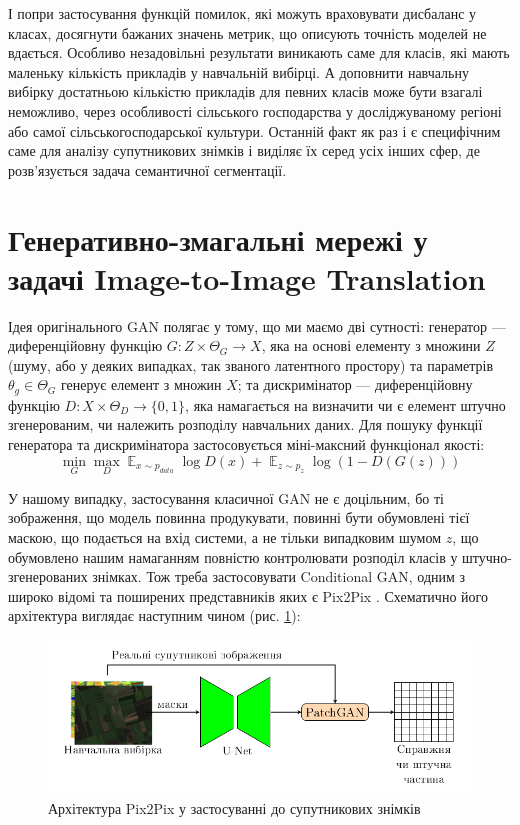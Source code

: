 \documentclass{ConfFTI}
\DeclareMathOperator{\E}{\mathbb{E}}
\begin{document}
І попри застосування
функцій помилок, які можуть враховувати дисбаланс у
класах, досягнути бажаних значень метрик, що описують точність
моделей не вдається.
Особливо незадовільні результати виникають саме для класів,
які мають маленьку кількість прикладів у навчальній вибірці.
А доповнити навчальну вибірку достатньою кількістю
прикладів для певних класів може бути взагалі неможливо,
через особливості сільського господарства у досліджуваному регіоні
або самої сільськогосподарської культури. Останній факт як раз
і є специфічним саме для аналізу супутникових знімків і
виділяє їх серед усіх інших сфер,
де розв'язується задача семантичної сегментації.

\section{Генеративно-змагальні мережі у задачі Image-to-Image Translation}

Ідея оригінального GAN  \cite{goodfellow2014generative}
полягає у тому, що ми маємо дві сутності:
генератор --- диференційовну функцію $G: Z \times \Theta_G \rightarrow X$, яка
на основі елементу з множини $Z$(шуму, або у деяких випадках,
так званого латентного простору) та параметрів $\theta_g \in \Theta_G$
генерує елемент з множин $X$; та дискримінатор
--- диференційовну функцію $D: X \times \Theta_D \rightarrow \{0, 1\}$, яка
намагається на визначити чи є елемент штучно згенерованим, чи
належить розподілу навчальних даних. Для пошуку функції
генератора та дискримінатора застосовується міні-максний функціонал якості:
$$ \min\limits_{G}\max\limits_{D}
	\E_{x \sim p_{data}} \log D(x) +
	\E_{z \sim p_{z}} \log (1 - D(G(z))) $$

У нашому випадку, застосування класичної GAN не є доцільним,
бо ті зображення,
що модель повинна продукувати, повинні бути обумовлені
тієї маскою, що подається на вхід системи,
а не тільки випадковим шумом $z$, що обумовлено нашим
намаганням повністю контролювати розподіл класів
у штучно-згенерованих знімках. Тож треба
застосовувати Conditional GAN, одним з широко відомі та поширених
представників яких є Pix2Pix \cite{pix2pix}. Схематично його
архітектура виглядає наступним чином (рис. \ref{fig:pix2pix}):

\begin{figure}[ht]
	\centering
	\includegraphics[width= 0.49 \textwidth]{pix2pix.png}
	\caption{Архітектура Pix2Pix у застосуванні до супутникових знімків}
	\label{fig:pix2pix}
\end{figure}
\end{document}
